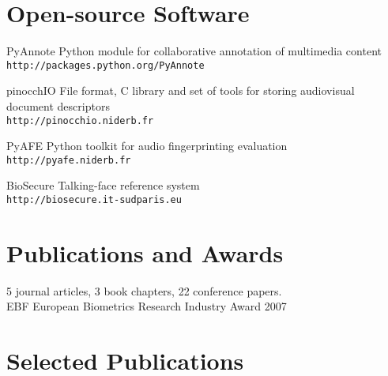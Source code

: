 \documentclass{simplecv}
\begin{document}
\section{Open-source Software}
\begin{topic}
\item[PyAnnote] Python module for collaborative annotation of multimedia content\\
\texttt{\small http://packages.python.org/PyAnnote}
\item[pinocchIO] File format, C library and set of tools for storing audiovisual document descriptors\\
\texttt{\small http://pinocchio.niderb.fr}
\item[PyAFE] Python toolkit for audio fingerprinting evaluation~\cite{Ramona2011}\\
\texttt{\small http://pyafe.niderb.fr}
\item[BioSecure] Talking-face reference system~\cite{Bredin2006a}\\
\texttt{\small http://biosecure.it-sudparis.eu}
\end{topic}

\section{Publications and Awards}

5 journal articles, 3 book chapters, 22 conference papers.\\
EBF European Biometrics Research Industry Award 2007~\cite{Bredin2008}

\section{Selected Publications}
\nocite{Bredin2012,Bredin2012a,Ramona2011,Bredin2009,Bredin2008,Bredin2007,Argones-Rua2007a,Bredin2006a}


\end{document}
